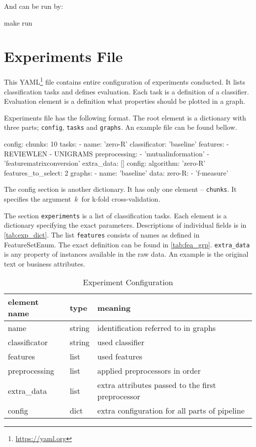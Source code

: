 And can be run by:

\begin{code}
make run
\end{code}

\section{Experiments File}

This YAML\footnote{\url{https://yaml.org}}  file contains entire configuration of experiments conducted.
It lists classification tasks and defines evaluation.
Each task is a definition of a classifier.
Evaluation element is a definition what properties should be plotted in a graph.

Experiments file has the following format.
The root element is a dictionary with three parts;
\texttt{config}, \texttt{tasks} and \texttt{graphs}.
An example file can be found bellow.

\begin{code}
config:
  chunks: 10
tasks:
  - name: 'zero-R'
    classificator: 'baseline'
    features:
      - REVIEWLEN
      - UNIGRAMS
    preprocessing:
      - 'mutualinformation'
      - 'featurematrixconversion'
    extra_data: []
    config:
      algorithm: 'zero-R'
      features_to_select: 2
graphs:
  - name: 'baseline'
    data:
      zero-R:
        - 'f-measure'
\end{code}

The config section is another dictionary.
It has only one element -- \texttt{chunks}.
It specifies the argument~$k$~for k-fold cross-validation.

The section \texttt{experiments} is a list of classification tasks.
Each element is a dictionary specifying the exact parameters.
Descriptions of individual fields is in \autoref{tab:exp_dict}.
The list \texttt{features} consists of names as defined in FeatureSetEnum.
The exact definition can be found in \autoref{tab:fea_grp}.
\texttt{extra\_data} is any property of instances available in the raw data.
An example is the original text or business attributes.

\begin{table}[h]

\centering
\begin{tabular}{lll}
\toprule
\textbf{element name} & \textbf{type} & \textbf{meaning}\\
\midrule
name 			& string	& identification referred to in graphs\\
classificator 	& string	& used classifier\\
features 		& list		& used features \\
preprocessing 	& list		& applied preprocessors in order\\
extra\_data 	& list 		& extra attributes passed to the first preprocessor \\
config			& dict		& extra configuration for all parts of pipeline \\
\bottomrule
\end{tabular}

\caption{Experiment Configuration}\label{tab:exp_dict}
\end{table}


